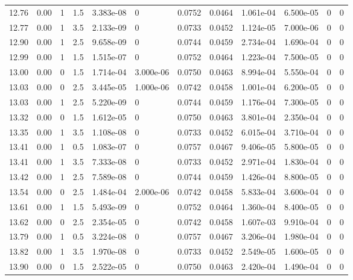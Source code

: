 \documentclass[preview]{standalone}
\begin{document}
{{{{{\begin{tabular}{L{1.2cm}C{1.2cm} C{0.3cm}C{0.5cm} C{1.4cm}C{1.4cm} C{1.4cm}C{1.4cm} C{1.6cm}C{1.6cm} C{1.6cm}C{1.6cm}}
  12.76  &  0.00  & 1     & 1.5 &  3.383e-08  & 0  &  0.0752&   0.0464& 1.061e-04 & 6.500e-05   &  0 & 0  \\ 
  12.77  &  0.00  & 1     & 3.5 &  2.133e-09  & 0  &  0.0733&   0.0452& 1.124e-05 & 7.000e-06   &  0 & 0  \\ 
  12.90  &  0.00  & 1     & 2.5 &  9.658e-09  & 0  &  0.0744&   0.0459& 2.734e-04 & 1.690e-04   &  0 & 0  \\ 
  12.99  &  0.00  & 1     & 1.5 &  1.515e-07  & 0  &  0.0752&   0.0464& 1.223e-04 & 7.500e-05   &  0 & 0  \\ 
  13.00  &  0.00  & 0     & 1.5 &  1.714e-04  & 3.000e-06  &  0.0750&   0.0463& 8.994e-04 & 5.550e-04   &  0 & 0  \\ 
  13.03  &  0.00  & 0     & 2.5 &  3.445e-05  & 1.000e-06  &  0.0742&   0.0458& 1.001e-04 & 6.200e-05   &  0 & 0  \\ 
  13.03  &  0.00  & 1     & 2.5 &  5.220e-09  & 0  &  0.0744&   0.0459& 1.176e-04 & 7.300e-05   &  0 & 0  \\ 
  13.32  &  0.00  & 0     & 1.5 &  1.612e-05  & 0  &  0.0750&   0.0463& 3.801e-04 & 2.350e-04   &  0 & 0  \\ 
  13.35  &  0.00  & 1     & 3.5 &  1.108e-08  & 0  &  0.0733&   0.0452& 6.015e-04 & 3.710e-04   &  0 & 0  \\ 
  13.41  &  0.00  & 1     & 0.5 &  1.083e-07  & 0  &  0.0757&   0.0467& 9.406e-05 & 5.800e-05   &  0 & 0  \\ 
  13.41  &  0.00  & 1     & 3.5 &  7.333e-08  & 0  &  0.0733&   0.0452& 2.971e-04 & 1.830e-04   &  0 & 0  \\ 
  13.42  &  0.00  & 1     & 2.5 &  7.589e-08  & 0  &  0.0744&   0.0459& 1.426e-04 & 8.800e-05   &  0 & 0  \\ 
  13.54  &  0.00  & 0     & 2.5 &  1.484e-04  & 2.000e-06  &  0.0742&   0.0458& 5.833e-04 & 3.600e-04   &  0 & 0  \\ 
  13.61  &  0.00  & 1     & 1.5 &  5.493e-09  & 0  &  0.0752&   0.0464& 1.360e-04 & 8.400e-05   &  0 & 0  \\ 
  13.62  &  0.00  & 0     & 2.5 &  2.354e-05  & 0  &  0.0742&   0.0458& 1.607e-03 & 9.910e-04   &  0 & 0  \\ 
  13.79  &  0.00  & 1     & 0.5 &  3.224e-08  & 0  &  0.0757&   0.0467& 3.206e-04 & 1.980e-04   &  0 & 0  \\ 
  13.82  &  0.00  & 1     & 3.5 &  1.970e-08  & 0  &  0.0733&   0.0452& 2.549e-05 & 1.600e-05   &  0 & 0  \\ 
  13.90  &  0.00  & 0     & 1.5 &  2.522e-05  & 0  &  0.0750&   0.0463& 2.420e-04 & 1.490e-04   &  0 & 0  \\ 

\end{tabular}}}}}}
\end{document}

